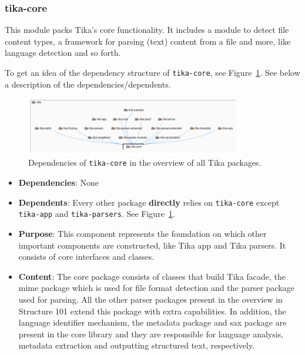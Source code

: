 \documentclass{article}
\begin{document}
\subsubsection{tika-core}
This module packs Tika's core functionality. It includes a module to detect file content types, a framework for parsing (text) content from a file and more, like language detection and so forth.

To get an idea of the dependency structure of \texttt{tika-core}, see Figure~\ref{fig:tika_core/s101-overview}. See below a description of the dependencies/dependents.


\begin{figure}[ht]
    \centering
    \includegraphics[width=0.85\textwidth]{report/images/tika_core/s101-overview.png}
    \caption{Dependencies of \texttt{tika-core} in the overview of all Tika packages.}
    \label{fig:tika_core/s101-overview}
\end{figure}

\begin{itemize}
    \item \textbf{Dependencies}: None
    \item \textbf{Dependents}: Every other package
    \textbf{directly} relies on \texttt{tika-core} except \texttt{tika-app} and \texttt{tika-parsers}. See Figure~\ref{fig:tika_core/s101-overview}.
    \item\textbf{Purpose}: This component represents the foundation on which other important components are constructed, like Tika app and Tika parsers. It consists of core interfaces and classes. 

\item\textbf{Content}: The core package consists of classes that build Tika facade, the mime package which is used for file format detection and the parser package used for parsing. All the other parser packages present in the overview in Structure 101 extend this package with extra capabilities. In addition, the language identifier mechanism, the metadata package and sax package are present in the core library and they are responsible for language analysis, metadata extraction and outputting structured text, respectively.

\end{itemize}
\end{document}
